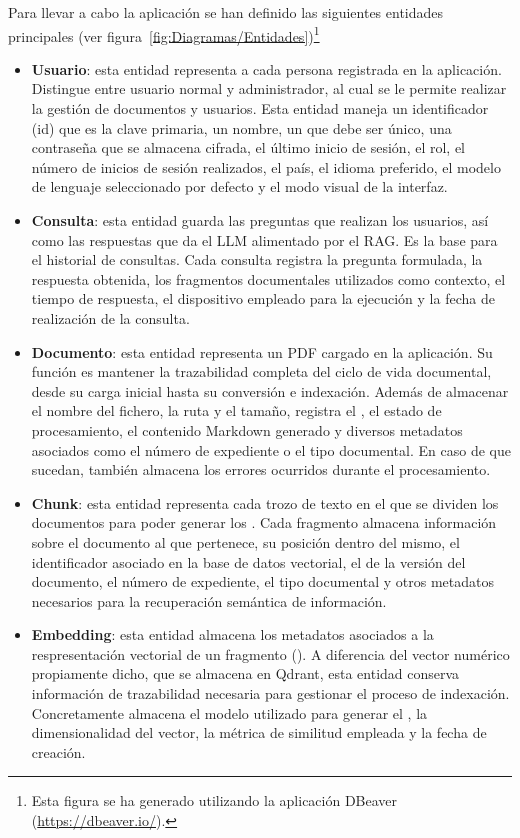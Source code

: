 Para llevar a cabo la aplicación se han definido las siguientes entidades principales (ver figura~\ref{fig:Diagramas/Entidades})\footnote{Esta figura se ha generado utilizando la aplicación DBeaver (\href{https://dbeaver.io/}{https://dbeaver.io/}).}
\begin{itemize}
	\item \textbf{Usuario}: esta entidad representa a cada persona registrada en la aplicación. Distingue entre usuario normal y administrador, al cual se le permite realizar la gestión de documentos y usuarios. Esta entidad maneja un identificador (id) que es la clave primaria, un nombre, un  que debe ser único, una contraseña que se almacena cifrada, el último inicio de sesión, el rol, el número de inicios de sesión realizados, el país, el idioma preferido, el modelo de lenguaje seleccionado por defecto y el modo visual de la interfaz.
	\item \textbf{Consulta}: esta entidad guarda las preguntas que realizan los usuarios, así como las respuestas que da el LLM alimentado por el RAG. Es la base para el historial de consultas. Cada consulta registra la pregunta formulada, la respuesta obtenida, los fragmentos documentales utilizados como contexto, el tiempo de respuesta, el dispositivo empleado para la ejecución y la fecha de realización de la consulta.
	\item \textbf{Documento}: esta entidad representa un PDF cargado en la aplicación. Su función es mantener la trazabilidad completa del ciclo de vida documental, desde su carga inicial hasta su conversión e indexación. Además de almacenar el nombre del fichero, la ruta y el tamaño, registra el , el estado de procesamiento, el contenido Markdown generado y diversos metadatos asociados como el número de expediente o el tipo documental. En caso de que sucedan, también almacena los errores ocurridos durante el procesamiento. 
	\item \textbf{Chunk}: esta entidad representa cada trozo de texto en el que se dividen los documentos para poder generar los . Cada fragmento almacena información sobre el documento al que pertenece, su posición dentro del mismo, el identificador asociado en la base de datos vectorial, el  de la versión del documento, el número de expediente, el tipo documental y otros metadatos necesarios para la recuperación semántica de información.
	\item \textbf{Embedding}: esta entidad almacena los metadatos asociados a la respresentación vectorial de un fragmento (). A diferencia del vector numérico propiamente dicho, que se almacena en Qdrant, esta entidad conserva información de trazabilidad necesaria para gestionar el proceso de indexación. Concretamente almacena el modelo utilizado para generar el , la dimensionalidad del vector, la métrica de similitud empleada y la fecha de creación.

\end{itemize}
